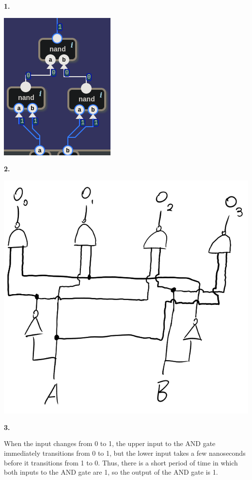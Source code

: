 \documentclass{article}
\begin{document}
\pagecolor{black}
\color{white}

\medskip\noindent\textbf{1.} \begin{center}\includegraphics{or_gate.png}\end{center}    

\medskip\noindent\textbf{2.} \begin{center}\includegraphics[scale=.5]{2-4-line.png}\end{center}

\medskip\noindent\textbf{3.}

    When the input changes from 0 to 1, the upper input to the AND gate immediately transitions from 0 to 1, but the lower input takes a few nanoseconds before it transitions from 1 to 0. Thus, there is a short period of time in which both inputs to the AND gate are 1, so the output of the AND gate is 1.
\end{document}
